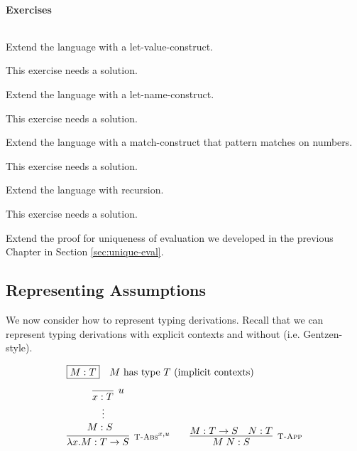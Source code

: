 
\paragraph{Exercises}$\;$\\
\begin{Exercise}
Extend the language with a let-value-construct.
\end{Exercise}
\begin{Answer}
This exercise needs a solution.
\end{Answer}

\begin{Exercise}
Extend the language with a let-name-construct.
\end{Exercise}
\begin{Answer}
This exercise needs a solution.
\end{Answer}

\begin{Exercise}
Extend the language with a match-construct that pattern matches on numbers.
\end{Exercise}
\begin{Answer}
This exercise needs a solution.
\end{Answer}

\begin{Exercise}
Extend the language with recursion.
\end{Exercise}
\begin{Answer}
This exercise needs a solution.
\end{Answer}


\begin{Exercise}
Extend the proof for uniqueness of evaluation we developed in the
previous Chapter in Section \ref{sec:unique-eval}.
\end{Exercise}

\subsection{Representing Assumptions }\label{sec:HOAS-Assumptions}
We now consider how to represent typing derivations. Recall that we can
represent typing derivations with explicit contexts and without
(i.e. Gentzen-style).

\[
\begin{array}{c@{\qquad}c}
\multicolumn{2}{l}{ \fbox{$M:T$} \quad \mbox{$M$ has type $T$ (implicit contexts)}} \\[1em]
\infer[\TFn^{x,u}]{\lam x.M : T \arrow S}
                 {\hypo{\quad\infer[u]{x:T}{}}{M:S~~}} &
\infer[\TApp]{M\;N : S}{M : T \arrow S & N:T}
\end{array}
\]

